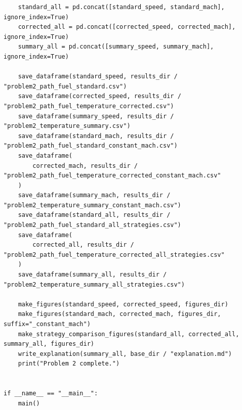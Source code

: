 \documentclass[UTF8]{ctexart}
\begin{document}
\begin{center}
\begin{lstlisting}
    standard_all = pd.concat([standard_speed, standard_mach], ignore_index=True)
    corrected_all = pd.concat([corrected_speed, corrected_mach], ignore_index=True)
    summary_all = pd.concat([summary_speed, summary_mach], ignore_index=True)

    save_dataframe(standard_speed, results_dir / "problem2_path_fuel_standard.csv")
    save_dataframe(corrected_speed, results_dir / "problem2_path_fuel_temperature_corrected.csv")
    save_dataframe(summary_speed, results_dir / "problem2_temperature_summary.csv")
    save_dataframe(standard_mach, results_dir / "problem2_path_fuel_standard_constant_mach.csv")
    save_dataframe(
        corrected_mach, results_dir / "problem2_path_fuel_temperature_corrected_constant_mach.csv"
    )
    save_dataframe(summary_mach, results_dir / "problem2_temperature_summary_constant_mach.csv")
    save_dataframe(standard_all, results_dir / "problem2_path_fuel_standard_all_strategies.csv")
    save_dataframe(
        corrected_all, results_dir / "problem2_path_fuel_temperature_corrected_all_strategies.csv"
    )
    save_dataframe(summary_all, results_dir / "problem2_temperature_summary_all_strategies.csv")

    make_figures(standard_speed, corrected_speed, figures_dir)
    make_figures(standard_mach, corrected_mach, figures_dir, suffix="_constant_mach")
    make_strategy_comparison_figures(standard_all, corrected_all, summary_all, figures_dir)
    write_explanation(summary_all, base_dir / "explanation.md")
    print("Problem 2 complete.")


if __name__ == "__main__":
    main()

	
	\end{lstlisting}
\end{center}
\end{document}
